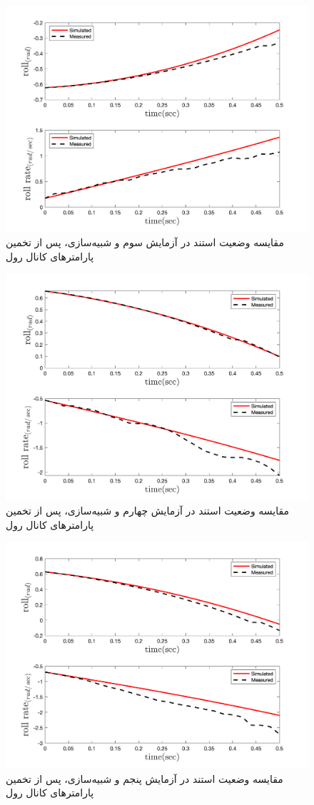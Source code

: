 \begin{figure}[H]
	\includegraphics[width=12cm]{../../Figures/RCP/roll_parameter_estimation/RCP_roll_S3.png}
	\centering
	\caption{مقايسه وضعیت استند در  آزمايش سوم و شبیه‌سازی، پس از تخمین پارامترهای کانال رول}
	\label{roll_ps3}
\end{figure}
\begin{figure}[H]
	\includegraphics[width=12cm]{../../Figures/RCP/roll_parameter_estimation/RCP_roll_S4.png}
	\centering
	\caption{مقايسه وضعیت استند در  آزمايش چهارم و شبیه‌سازی، پس از تخمین پارامترهای کانال رول}
	\label{roll_ps4}
\end{figure}
\begin{figure}[H]
	\includegraphics[width=12cm]{../../Figures/RCP/roll_parameter_estimation/RCP_roll_S5.png}
	\centering
	\caption{مقايسه وضعیت استند در  آزمايش پنجم و شبیه‌سازی، پس از تخمین پارامترهای کانال رول}
	\label{roll_ps5}
\end{figure}